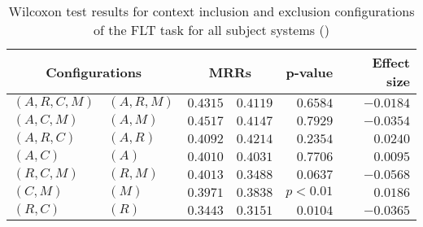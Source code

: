 
\begin{table}
\begin{spacing}{1.2}
\centering
\caption{Wilcoxon test results for context inclusion and exclusion configurations of the FLT task for all subject systems (\ctwo)}
\label{table:versus-wilcox-all-flt-context}
\begin{tabular}{ll|rr|rr}
\toprule
      \multicolumn{2}{c|}{Configurations} &                \multicolumn{2}{c|}{MRRs} &             p-value & Effect size \\
\midrule
 $(A,R,C,M)$ &  $(A,R,M)$ &  $\bm{0.4315}$ &       $0.4119$ & $0.6584$ &   $-0.0184$ \\
   $(A,C,M)$ &    $(A,M)$ &  $\bm{0.4517}$ &       $0.4147$ & $0.7929$ &   $-0.0354$ \\
   $(A,R,C)$ &    $(A,R)$ &       $0.4092$ &  $\bm{0.4214}$ & $0.2354$ &    $0.0240$ \\
     $(A,C)$ &      $(A)$ &       $0.4010$ &  $\bm{0.4031}$ & $0.7706$ &    $0.0095$ \\
   $(R,C,M)$ &    $(R,M)$ &  $\bm{0.4013}$ &       $0.3488$ & $0.0637$ &   $-0.0568$ \\
     $(C,M)$ &      $(M)$ &  $\bm{0.3971}$ &       $0.3838$ & $p<0.01$ &    $0.0186$ \\
     $(R,C)$ &      $(R)$ &  $\bm{0.3443}$ &       $0.3151$ & $0.0104$ &   $-0.0365$ \\
\bottomrule
\end{tabular}

\end{spacing}
\end{table}

